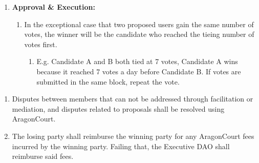 \begin{enumerate}
\begin{enumerate}
\begin{enumerate}
			\item \textbf{Approval \& Execution:}
			\begin{enumerate}
				\item In the exceptional case that two proposed users gain the same number of votes, the winner will be the candidate who reached the tieing number of votes first.
				\begin{enumerate}
					\item E.g. Candidate A and B both tied at 7 votes, Candidate A wins because it reached 7 votes a day before Candidate B. If votes are submitted in the same block, repeat the vote.
				\end{enumerate}
			\end{enumerate}
		\end{enumerate}
	\end{enumerate}
	
	\begin{enumerate}
		\item Disputes between members that can not be addressed through facilitation or mediation, and disputes related to proposals shall be resolved using \gls{AragonCourt}.
		\item The losing party shall reimburse the winning party for any \gls{AragonCourt} fees incurred by the winning party. Failing that, the Executive \ac{DAO} shall reimburse said fees.
	\end{enumerate}
\end{enumerate}